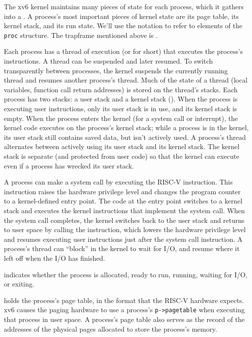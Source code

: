 The xv6 kernel maintains many pieces of state for each process,
which it gathers into a
.
A process's most important pieces of kernel state are its 
page table, its kernel stack, and its run state.
We'll use the notation
to refer to elements of the
\lstinline{proc}
structure.  The trapframe mentioned above is .

Each process has a thread of execution (or 
for short) that executes the process's instructions.
A thread can be suspended and later resumed.
To switch transparently between processes,
the kernel suspends the currently running thread and resumes another process's
thread.  Much of the state of a thread (local variables, function call return
addresses) is stored on the thread's stacks.
Each process has two stacks: a user stack and a kernel stack
().
When the process is executing user instructions, only its user stack
is in use, and its kernel stack is empty.
When the process enters the kernel (for a system call or interrupt),
the kernel code executes on the process's kernel stack; while
a process is in the kernel, its user stack still contains saved
data, but isn't actively used.
A process's thread alternates between actively using its user stack
and its kernel stack. The kernel stack is separate (and protected from
user code) so that the kernel
can execute even if a process has wrecked its user stack.

A process can make a system call by executing the RISC-V 
instruction. This instruction raises the hardware privilege level and
changes the program counter to a kernel-defined entry point.  The code
at the entry point switches to a kernel stack and executes the kernel
instructions that implement the system call.  When the system call
completes, the kernel switches back to the user stack and returns to
user space by calling the  instruction, which lowers
the hardware privilege level and resumes executing user instructions
just after the system call instruction.  A process's thread can
``block'' in the kernel to wait for I/O, and resume where it left off
when the I/O has finished.

indicates whether the process is allocated, ready
to run, running, waiting for I/O, or exiting.

holds the process's page table, in the format
that the RISC-V hardware expects.
xv6 causes the paging hardware to use a process's
\lstinline{p->pagetable}
when executing that process in user space.
A process's page table also serves as the record of the
addresses of the physical pages allocated to store the process's memory.

